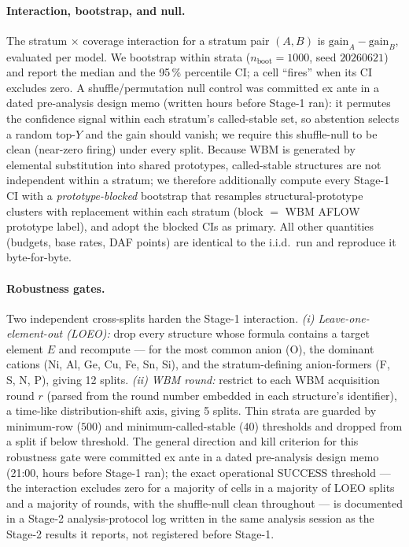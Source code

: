 \documentclass[11pt]{article}
\begin{document}
\paragraph{Interaction, bootstrap, and null.} The stratum $\times$ coverage interaction for a
stratum pair $(A,B)$ is $\mathrm{gain}_A - \mathrm{gain}_B$, evaluated per model. We bootstrap
within strata ($n_{\mathrm{boot}} = 1000$, seed $20260621$) and report the median and the
95\,\% percentile CI; a cell ``fires'' when its CI excludes zero. A shuffle/permutation
null control was committed ex ante in a dated pre-analysis design memo (written
hours before Stage-1 ran): it permutes the confidence signal within each
stratum's called-stable set, so abstention selects a random top-$Y$ and the gain should
vanish; we require this shuffle-null to be clean (near-zero firing) under every split.
Because WBM is generated by elemental substitution into shared prototypes, called-stable
structures are not independent within a stratum; we therefore additionally compute every
Stage-1 CI with a \emph{prototype-blocked} bootstrap that resamples
structural-prototype clusters with replacement within each stratum (block $=$ WBM
AFLOW prototype label), and adopt the blocked CIs as primary. All other quantities
(budgets, base rates, DAF points) are identical to the i.i.d.\ run and reproduce it
byte-for-byte.

\paragraph{Robustness gates.} Two independent cross-splits harden the Stage-1 interaction.
\emph{(i) Leave-one-element-out (LOEO):} drop every structure whose formula contains a
target element $E$ and recompute --- for the most common anion (O), the dominant cations
(Ni, Al, Ge, Cu, Fe, Sn, Si), and the stratum-defining anion-formers (F, S, N, P), giving 12
splits. \emph{(ii) WBM round:} restrict to each WBM acquisition round $r$ (parsed from
the round number embedded in each structure's identifier), a time-like distribution-shift axis,
giving 5 splits. Thin strata are guarded by minimum-row ($500$) and minimum-called-stable
($40$) thresholds and dropped from a split if below threshold. The general direction and
kill criterion for this robustness gate were committed ex ante in
a dated pre-analysis design memo (21:00, hours before Stage-1 ran); the exact operational
SUCCESS threshold --- the interaction excludes zero for a majority of cells in a majority of
LOEO splits and a majority of rounds, with the shuffle-null clean throughout --- is
documented in a Stage-2 analysis-protocol log written in the
same analysis session as the Stage-2 results it reports, not registered before Stage-1.
\end{document}
